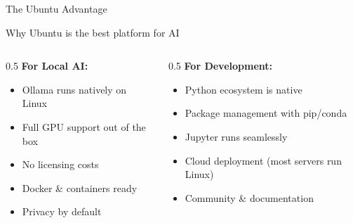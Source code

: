 \documentclass[aspectratio=169,12pt]{beamer}
\begin{document}
\begin{frame}{The Ubuntu Advantage}
\begin{center}
{\Large Why Ubuntu is the best platform for AI}
\end{center}
\vspace{0.5cm}
\begin{columns}
\begin{column}{0.5\textwidth}
\textbf{For Local AI:}
\begin{itemize}
\item Ollama runs natively on Linux
\item Full GPU support out of the box
\item No licensing costs
\item Docker \& containers ready
\item Privacy by default
\end{itemize}
\end{column}
\begin{column}{0.5\textwidth}
\textbf{For Development:}
\begin{itemize}
\item Python ecosystem is native
\item Package management with pip/conda
\item Jupyter runs seamlessly
\item Cloud deployment (most servers run Linux)
\item Community \& documentation
\end{itemize}
\end{column}
\end{columns}
\vspace{0.5cm}
\begin{center}
\end{center}
\end{frame}
\end{document}
